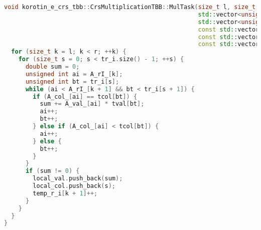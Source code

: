 \documentclass[a4paper,12pt]{article}
\begin{document}
\begin{lstlisting}[language=C++]
void korotin_e_crs_tbb::CrsMultiplicationTBB::MulTask(size_t l, size_t r, std::vector<double> &local_val,
                                                      std::vector<unsigned int> &local_col,
                                                      std::vector<unsigned int> &temp_r_i,
                                                      const std::vector<unsigned int> &tr_i,
                                                      const std::vector<unsigned int> &tcol,
                                                      const std::vector<double> &tval) {
  for (size_t k = l; k < r; ++k) {
    for (size_t s = 0; s < tr_i.size() - 1; ++s) {
      double sum = 0;
      unsigned int ai = A_rI_[k];
      unsigned int bt = tr_i[s];
      while (ai < A_rI_[k + 1] && bt < tr_i[s + 1]) {
        if (A_col_[ai] == tcol[bt]) {
          sum += A_val_[ai] * tval[bt];
          ai++;
          bt++;
        } else if (A_col_[ai] < tcol[bt]) {
          ai++;
        } else {
          bt++;
        }
      }
      if (sum != 0) {
        local_val.push_back(sum);
        local_col.push_back(s);
        temp_r_i[k + 1]++;
      }
    }
  }
}
\end{lstlisting}
\end{document}
